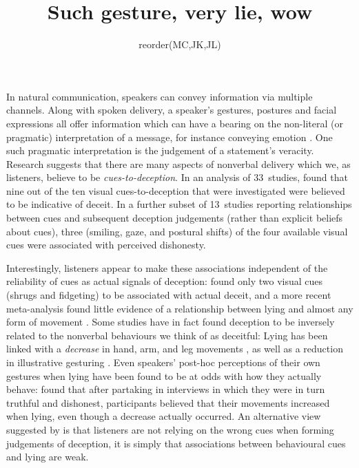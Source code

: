 \documentclass[a4paper,man,natbib]{apa6}
\title{Such gesture, very lie, wow}
\author{reorder(MC,JK,JL)}
\affiliation{Psychology, PPLS, University of Edinburgh}
\newcommand*{\term}[1]{\emph{#1}} %
\begin{document}
\maketitle
\linenumbers
\noindent
In natural communication, speakers can convey information via multiple channels.
Along with spoken delivery, a speaker's gestures, postures and facial expressions all offer information which can have a bearing on the non-literal (or pragmatic) interpretation of a message, for instance conveying emotion \citep{Busso2004, Gregersen2005}.
One such pragmatic interpretation is the judgement of a statement's veracity.
Research suggests that there are many aspects of nonverbal delivery which we, as listeners, believe to be \term{cues-to-deception}. 
In an analysis of 33~studies, \citet{Zuckerman1981} found that nine out of the ten visual cues-to-deception that were investigated were believed to be indicative of deceit. 
In a further subset of 13~studies reporting relationships between cues and subsequent deception judgements (rather than explicit beliefs about cues), three (smiling, gaze, and postural shifts) of the four available visual cues were associated with perceived dishonesty.

Interestingly, listeners appear to make these associations independent of the reliability of cues as actual signals of deception: \citet{Zuckerman1981} found only two visual cues (shrugs and fidgeting) to be associated with actual deceit, and a more recent meta-analysis found little evidence of a relationship between lying and almost any form of movement \citep{DePaulo2003}.
Some studies have in fact found deception to be inversely related to the nonverbal behaviours we think of as deceitful:
Lying has been linked with a \emph{decrease} in hand, arm, and leg movements \citep[e.g.][]{DePaulo1992, Ekman1989, Vrij1995}, as well as a reduction in illustrative gesturing \citep[e.g.][]{DePaulo2003, Cohen2010}.
Even speakers' post-hoc perceptions of their own gestures when lying have been found to be at odds with how they actually behave:
\citet{Vrij1996} found that after partaking in interviews in which they were in turn truthful and dishonest, participants believed that their movements increased when lying, even though a decrease actually occurred.
An alternative view suggested by \citet{Hartwig2011} is that listeners are not relying on the wrong cues when forming judgements of deception, it is simply that associations between behavioural cues and lying are weak.
\end{document}
